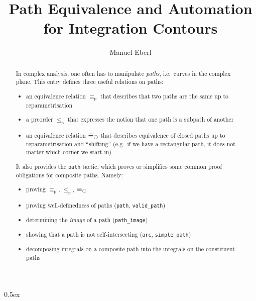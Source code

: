 \documentclass[11pt,a4paper]{article}
\begin{document}
\title{Path Equivalence and Automation\\ for Integration Contours}
\author{Manuel Eberl}
\maketitle

\begin{abstract}
\noindent 
In complex analysis, one often has to manipulate \emph{paths}, i.e.\ curves in the complex plane. 
This entry defines three useful relations on paths:
\begin{itemize}
\item an equivalence relation $\equiv_{\text{p}}$ that describes that two paths are the same up to 
  reparametrisation
\item a preorder $\leq_{\text{p}}$ that expresses the notion that one path is a subpath of another
\item an equivalence relation $\equiv_{\ocircle}$ that describes equivalence of closed paths up to 
  reparametrisation and ``shifting'' (e.g.\ if we have a rectangular path, it does not matter
  which corner we start in)
\end{itemize}
It also provides the \texttt{path} tactic, which proves or simplifies some common proof obligations
for composite paths. Namely:
\begin{itemize}
\item proving $\equiv_{\text{p}}$, $\leq_{\text{p}}$, $\equiv_{\ocircle}$
\item proving well-definedness of paths (\texttt{path}, \texttt{valid\_path})
\item determining the \emph{image} of a path (\texttt{path\_image})
\item showing that a path is not self-intersecting (\texttt{arc}, \texttt{simple\_path})
\item decomposing integrals on a composite path into the integrals on the constituent paths
\end{itemize}
\end{abstract}
\newpage

\tableofcontents

\newpage
\parindent 0pt\parskip 0.5ex



\raggedright



\end{document}
